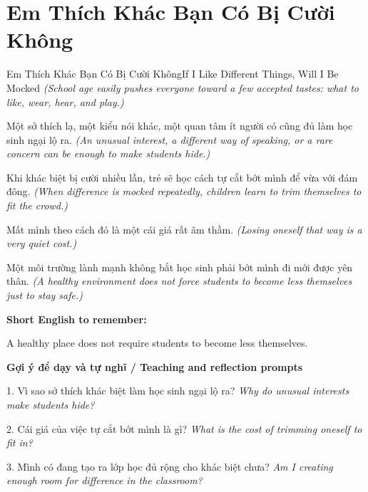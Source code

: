 \section{Em Thích Khác Bạn Có Bị Cười Không}
\begin{truyen}{Em Thích Khác Bạn Có Bị Cười Không}{If I Like Different Things, Will I Be Mocked}
\textit{(School age easily pushes everyone toward a few accepted tastes: what to like, wear, hear, and play.)}

Một sở thích lạ, một kiểu nói khác, một quan tâm ít người có cũng đủ làm học sinh ngại lộ ra.
\textit{(An unusual interest, a different way of speaking, or a rare concern can be enough to make students hide.)}

Khi khác biệt bị cười nhiều lần, trẻ sẽ học cách tự cắt bớt mình để vừa với đám đông.
\textit{(When difference is mocked repeatedly, children learn to trim themselves to fit the crowd.)}

Mất mình theo cách đó là một cái giá rất âm thầm.
\textit{(Losing oneself that way is a very quiet cost.)}

\end{truyen}

\begin{baihoc}
Một môi trường lành mạnh không bắt học sinh phải bớt mình đi mới được yên thân.
\textit{(A healthy environment does not force students to become less themselves just to stay safe.)}
\end{baihoc}

\begin{ghinhoanh}
\textbf{Short English to remember:}

A healthy place does not require students to become less themselves.

\end{ghinhoanh}

\begin{tuhocnhanh}
\textbf{Gợi ý để dạy và tự nghĩ / Teaching and reflection prompts}

1. Vì sao sở thích khác biệt làm học sinh ngại lộ ra? \textit{Why do unusual interests make students hide?}

2. Cái giá của việc tự cắt bớt mình là gì? \textit{What is the cost of trimming oneself to fit in?}

3. Mình có đang tạo ra lớp học đủ rộng cho khác biệt chưa? \textit{Am I creating enough room for difference in the classroom?}
\end{tuhocnhanh}
\ngancach

